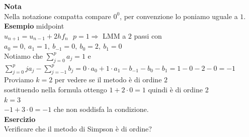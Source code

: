 \documentclass[12px]{article}
\begin{document}
\textbf{Nota}\\
Nella notazione compatta compare $0^0$, per convenzione lo poniamo uguale a $1$.\\
\textbf{Esempio} midpoint\\
$u_{n+1} = u_{n-1} + 2hf_n\ \ \ p = 1 \Rightarrow $  LMM a $2$ passi con \\
$a_0 = 0, \ a_1 =1, \ b_{-1}=0, \ b_{0}=2,\ b_{1} = 0$\\
Notiamo che  $ \sum^{p}_{j=0}a_j=1$ e $ \sum^{p}_{j=0}ja_j - \sum^{p}_{j=-1}b_j = 0\cdot a_0 + 1\cdot a_1 - b_{-1}- b_0- b_1 = 1 - 0 -2 -0  = -1$\\
Proviamo $k=2$ per vedere se il metodo è di ordine  $2$\\
sostituendo nella formula ottengo $1 + 2\cdot 0 = 1$ quindi è di ordine 2\\
 $k = 3$  \\
 $-1 + 3\cdot 0 = -1$ che non soddisfa la condizione.\\
  \textbf{Esercizio}\\
  Verificare che il metodo di Simpson è di ordine?
\end{document}
